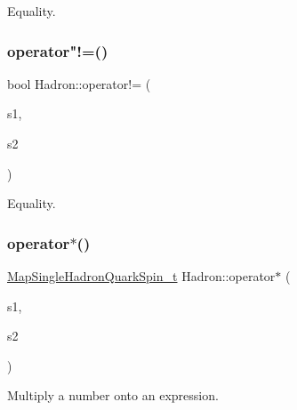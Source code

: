 Equality. 

\mbox{\label{namespaceHadron_a795c74aad8519c0dc1b46c0e3c44f095}} 
\subsubsection{\texorpdfstring{operator"!=()}{operator!=()}\hspace{0.1cm}{\footnotesize\ttfamily [3/3]}}
{\footnotesize\ttfamily bool Hadron\+::operator!= (\begin{DoxyParamCaption}\item[{const \mbox{\hyperlink{structHadron_1_1HadronDiagramTimeSlices__t}{Hadron\+Diagram\+Time\+Slices\+\_\+t}} \&}]{s1,  }\item[{const \mbox{\hyperlink{structHadron_1_1HadronDiagramTimeSlices__t}{Hadron\+Diagram\+Time\+Slices\+\_\+t}} \&}]{s2 }\end{DoxyParamCaption})}



Equality. 

\mbox{\label{namespaceHadron_a1ff2284ca0eec3b56aa1c075484c995f}} 
\subsubsection{\texorpdfstring{operator$\ast$()}{operator*()}\hspace{0.1cm}{\footnotesize\ttfamily [1/6]}}
{\footnotesize\ttfamily \mbox{\hyperlink{namespaceHadron_a22279e56b59508dc8dd2c8991dc911fd}{Map\+Single\+Hadron\+Quark\+Spin\+\_\+t}} Hadron\+::operator$\ast$ (\begin{DoxyParamCaption}\item[{double}]{s1,  }\item[{const \mbox{\hyperlink{namespaceHadron_a22279e56b59508dc8dd2c8991dc911fd}{Map\+Single\+Hadron\+Quark\+Spin\+\_\+t}} \&}]{s2 }\end{DoxyParamCaption})}



Multiply a number onto an expression. 

\mbox{\label{namespaceHadron_ab9e06323f5f25fbcb53926b3898935a6}} 

